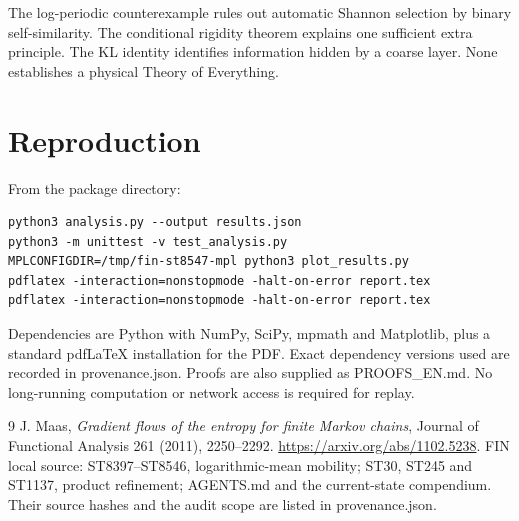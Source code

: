 \documentclass[11pt,a4paper]{article}
\begin{document}
The log-periodic counterexample rules out automatic Shannon selection by
binary self-similarity. The conditional rigidity theorem explains one
sufficient extra principle. The KL identity identifies information hidden
by a coarse layer. None establishes a physical Theory of Everything.

\appendix
\section{Reproduction}

From the package directory:
\begin{verbatim}
python3 analysis.py --output results.json
python3 -m unittest -v test_analysis.py
MPLCONFIGDIR=/tmp/fin-st8547-mpl python3 plot_results.py
pdflatex -interaction=nonstopmode -halt-on-error report.tex
pdflatex -interaction=nonstopmode -halt-on-error report.tex
\end{verbatim}

Dependencies are Python with NumPy, SciPy, mpmath and Matplotlib, plus a
standard pdfLaTeX installation for the PDF. Exact dependency versions used
are recorded in provenance.json. Proofs are also supplied as PROOFS\_EN.md.
No long-running computation or network access is required for replay.

\begin{thebibliography}{9}
 J. Maas, \emph{Gradient flows of the entropy for finite Markov
chains}, Journal of Functional Analysis 261 (2011), 2250--2292.
\url{https://arxiv.org/abs/1102.5238}.
 FIN local source: ST8397--ST8546, logarithmic-mean mobility;
ST30, ST245 and ST1137, product refinement; AGENTS.md and the current-state
compendium. Their source hashes and the audit scope are listed in provenance.json.
\end{thebibliography}
\end{document}
